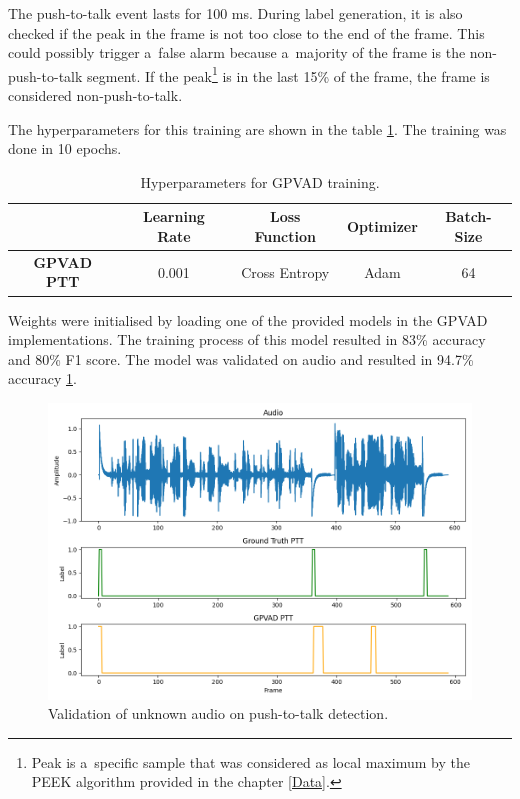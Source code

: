     The push-to-talk event lasts for 100 ms. During label generation, it is also checked if the peak in the frame is not too close to the end of the frame. This could possibly trigger a~false alarm because a~majority of the frame is the non-push-to-talk segment. If the peak\footnote{Peak is a~specific sample that was considered as local maximum by the PEEK algorithm provided in the chapter \ref{Data}.} is in the last 15\% of the frame, the frame is considered non-push-to-talk. 


    The hyperparameters for this training are shown in the table \ref{tableparametersGPVAD}. The training was done in 10 epochs.
    
    \begin{table}[!h]
    \begin{center}
    \begin{tabular}{|c|c|c|c|c|}\hline 
        & \textbf{Learning Rate} & \textbf{Loss Function} & \textbf{Optimizer} & \textbf{Batch-Size} \\ \hline
        \textbf{GPVAD PTT} & 0.001 & Cross Entropy & Adam & 64 \\ \hline
    \end{tabular}
    \caption{Hyperparameters for GPVAD training.}
    \label{tableparametersGPVAD}
    \end{center}
    \end{table}

    \newpage
   
    Weights were initialised by loading one of the provided models in the GPVAD implementations.  
    The training process of this model resulted in 83\% accuracy and 80\% F1 score. 
    The model was validated on audio and resulted in 94.7\% accuracy \ref{fig:validationgpvadptt}. 

    \begin{figure}[ht!]
        \centering
        \includegraphics[width = \textwidth]{obrazky-figures/GPVADPTT.png}
        \caption{Validation of unknown audio on push-to-talk detection.}
        \label{fig:validationgpvadptt}
    \end{figure}


